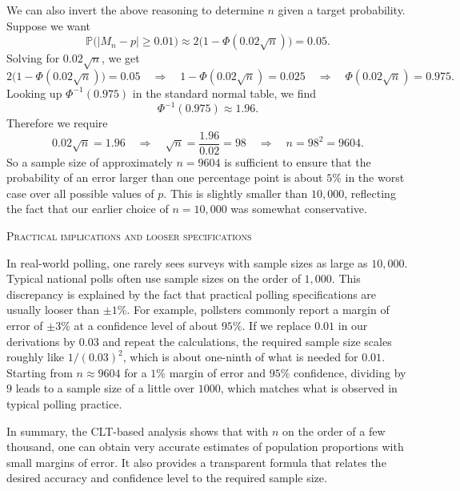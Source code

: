 We can also invert the above reasoning to determine \(n\) given a target probability.  
Suppose we want
\[
\mathbb{P}\big(|M_n - p| \geq 0.01\big)
\approx
2\big(1 - \Phi(0.02\sqrt{n})\big)
= 0.05.
\]
Solving for \(0.02\sqrt{n}\), we get
\[
2\big(1 - \Phi(0.02\sqrt{n})\big) = 0.05
\quad\Longrightarrow\quad
1 - \Phi(0.02\sqrt{n}) = 0.025
\quad\Longrightarrow\quad
\Phi(0.02\sqrt{n}) = 0.975.
\]
Looking up \(\Phi^{-1}(0.975)\) in the standard normal table, we find
\[
\Phi^{-1}(0.975) \approx 1.96.
\]
Therefore we require
\[
0.02\sqrt{n} = 1.96
\quad\Longrightarrow\quad
\sqrt{n} = \frac{1.96}{0.02}
=
98
\quad\Longrightarrow\quad
n = 98^2
=
9604.
\]
So a sample size of approximately \(n = 9604\) is sufficient to ensure that the probability of an error larger than one percentage point is about \(5\%\) in the worst case over all possible values of \(p\).  
This is slightly smaller than \(10{,}000\), reflecting the fact that our earlier choice of \(n = 10{,}000\) was somewhat conservative.

\bigskip
\textsc{Practical implications and looser specifications}

In real-world polling, one rarely sees surveys with sample sizes as large as \(10{,}000\).  
Typical national polls often use sample sizes on the order of \(1{,}000\).  
This discrepancy is explained by the fact that practical polling specifications are usually looser than \(\pm 1\%\).  
For example, pollsters commonly report a margin of error of \(\pm 3\%\) at a confidence level of about \(95\%\).  
If we replace \(0.01\) in our derivations by \(0.03\) and repeat the calculations, the required sample size scales roughly like \(1/(0.03)^2\), which is about one-ninth of what is needed for \(0.01\).  
Starting from \(n \approx 9604\) for a \(1\%\) margin of error and \(95\%\) confidence, dividing by \(9\) leads to a sample size of a little over \(1000\), which matches what is observed in typical polling practice.

In summary, the CLT-based analysis shows that with \(n\) on the order of a few thousand, one can obtain very accurate estimates of population proportions with small margins of error.  
It also provides a transparent formula that relates the desired accuracy and confidence level to the required sample size.